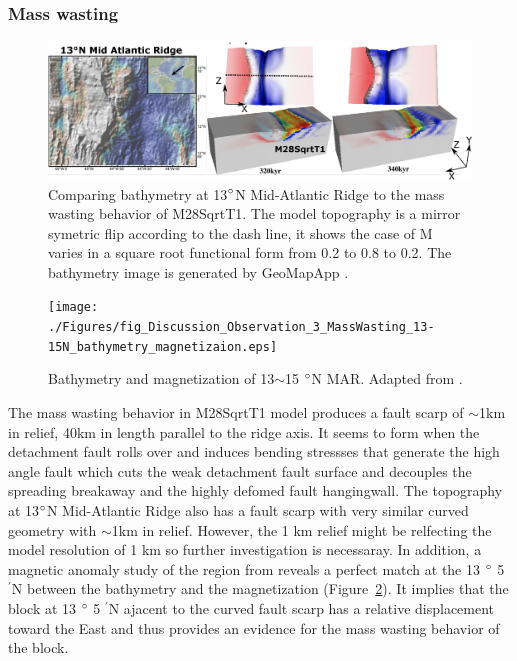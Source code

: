 \subsubsection{Mass wasting}

\begin{figure}[h]
 \centering
  \includegraphics[width=1.0\textwidth]{./Figures/fig_Discussion_Observation_1_13N_MAR_CutBack.eps}
 \caption[Comparing bathymetry at 13$\degree$N Mid-Atlantic Ridge to the mass wasting behavior of M28SqrtT1.]{Comparing bathymetry at 13$\degree$N Mid-Atlantic Ridge to the mass wasting behavior of M28SqrtT1. The model topography is a mirror symetric flip according to the dash line, it shows the case of M varies in a square root functional form from 0.2 to 0.8 to 0.2. The bathymetry image is generated by GeoMapApp \citep{Ryan2009}.}
 \label{fig_Discussion_Observation_1_13N_MAR_CutBack}
\end{figure}

\begin{figure}[h]
 \centering
  \texttt{[image: ./Figures/fig\_Discussion\_Observation\_3\_MassWasting\_13-15N\_bathymetry\_magnetizaion.eps]}
 \caption{Bathymetry and magnetization of 13$\sim$15 $\degree$N MAR. Adapted from \citep{Smith2008}.}
 \label{fig_Discussion_Observation_3_MassWasting_13-15N_bathymetry_magnetizaion}
\end{figure}

The mass wasting behavior in M28SqrtT1 model produces a fault scarp of $\sim$1km in relief, 40km in length parallel to the ridge axis. It seems to form when the detachment fault rolls over and induces bending stressses that generate the high angle fault which cuts the weak detachment fault surface and decouples the spreading breakaway and the highly defomed fault hangingwall. The topography at 13$\degree$N Mid-Atlantic Ridge also has a fault scarp with very similar curved geometry with $\sim$1km in relief. However, the 1 km relief might be relfecting the model resolution of 1 km so further investigation is necessaray. In addition, a magnetic anomaly study of the region from \citep{Smith2008} reveals a perfect match at the 13 $\degree$ 5 $^{\prime}$N between the bathymetry and the magnetization (Figure~\hyperref[fig_Discussion_Observation_3_MassWasting_13-15N_bathymetry_magnetizaion]{\ref{fig_Discussion_Observation_3_MassWasting_13-15N_bathymetry_magnetizaion}}). It implies that the block at 13 $\degree$ 5 $^{\prime}$N ajacent to the curved fault scarp has a relative displacement toward the East and thus provides an evidence for the mass wasting behavior of the block.   
 
